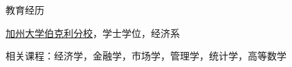 \begin{rubric}{教育经历}

\entry*[2012.8 -- 2015.12]%
    \href{https://www.berkeley.edu}{加州大学伯克利分校}，学士学位，经济系
    \par 相关课程：经济学，金融学，市场学，管理学，统计学，高等数学
%
\end{rubric}